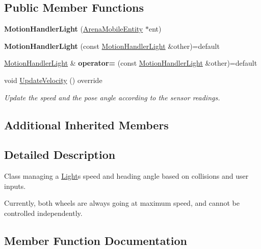 \subsection*{Public Member Functions}
\begin{DoxyCompactItemize}
\item 
{\bfseries Motion\+Handler\+Light} (\hyperlink{classArenaMobileEntity}{Arena\+Mobile\+Entity} $\ast$ent)\hypertarget{classMotionHandlerLight_a88d566ea410916c6c7e83cd686c9877b}{}\label{classMotionHandlerLight_a88d566ea410916c6c7e83cd686c9877b}

\item 
{\bfseries Motion\+Handler\+Light} (const \hyperlink{classMotionHandlerLight}{Motion\+Handler\+Light} \&other)=default\hypertarget{classMotionHandlerLight_a8e9b5085179878317856219d18a0d946}{}\label{classMotionHandlerLight_a8e9b5085179878317856219d18a0d946}

\item 
\hyperlink{classMotionHandlerLight}{Motion\+Handler\+Light} \& {\bfseries operator=} (const \hyperlink{classMotionHandlerLight}{Motion\+Handler\+Light} \&other)=default\hypertarget{classMotionHandlerLight_a746099c8d42f431852efed388b2425d0}{}\label{classMotionHandlerLight_a746099c8d42f431852efed388b2425d0}

\item 
void \hyperlink{classMotionHandlerLight_a1ea397bb0ae87d9002330125d05384d7}{Update\+Velocity} () override
\begin{DoxyCompactList}\small\item\em Update the speed and the pose angle according to the sensor readings. \end{DoxyCompactList}\end{DoxyCompactItemize}
\subsection*{Additional Inherited Members}


\subsection{Detailed Description}
Class managing a \hyperlink{classLight}{Light}\textquotesingle{}s speed and heading angle based on collisions and user inputs. 

Currently, both wheels are always going at maximum speed, and cannot be controlled independently. 

\subsection{Member Function Documentation}
